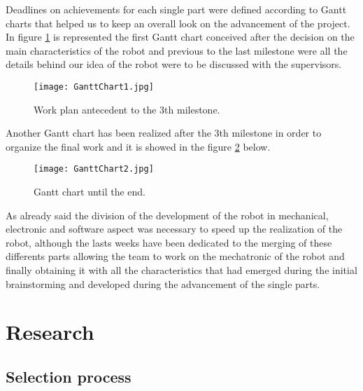 Deadlines on achievements for each single part were defined according to Gantt charts that helped us to keep an overall look on the advancement of the project.
In figure \ref{fig:GanttChart1} is represented the first Gantt chart conceived after the decision on the main characteristics of the robot and previous to the last milestone were all the details behind our idea of the robot were to be discussed with the supervisors.

\begin{figure}[H]
 \centering
 \texttt{[image: GanttChart1.jpg]}
 \caption{Work plan antecedent to the 3th milestone.}
\label{fig:GanttChart1}
\end{figure}


Another Gantt chart has been realized after the 3th milestone in order to organize the final work and it is showed in the figure \ref{fig:GanttChart2} below.

\begin{figure}[H]
 \centering
 \texttt{[image: GanttChart2.jpg]}
 \caption{Gantt chart until the end.}
\label{fig:GanttChart2}
\end{figure}


As already said the division of the development of the robot in mechanical, electronic and software aspect was necessary to speed up the realization of the robot, although the lasts weeks have been dedicated to the merging of these differents parts allowing the team to work on the mechatronic of the robot and finally obtaining it with all the characteristics that had emerged during the initial brainstorming and developed during the advancement of the single parts.

\chapter{Research}


\section{Selection process}


